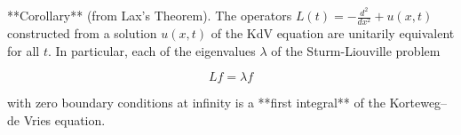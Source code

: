 **Corollary** (from Lax's Theorem). The operators $L(t) = -\frac{d^2}{dx^2} + u(x,t)$ constructed from a solution $u(x,t)$ of the KdV equation are unitarily equivalent for all $t$. In particular, each of the eigenvalues $\lambda$ of the Sturm-Liouville problem

$$Lf = \lambda f$$

with zero boundary conditions at infinity is a **first integral** of the Korteweg–de Vries equation.
